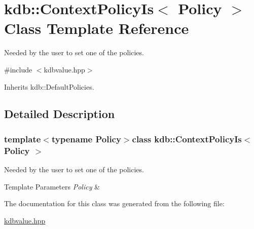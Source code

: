 \hypertarget{classkdb_1_1ContextPolicyIs}{\section{kdb\+:\+:Context\+Policy\+Is$<$ Policy $>$ Class Template Reference}
\label{classkdb_1_1ContextPolicyIs}
}


Needed by the user to set one of the policies.  




{\ttfamily \#include $<$kdbvalue.\+hpp$>$}



Inherits kdb\+::\+Default\+Policies.



\subsection{Detailed Description}
\subsubsection*{template$<$typename Policy$>$class kdb\+::\+Context\+Policy\+Is$<$ Policy $>$}

Needed by the user to set one of the policies. 


\begin{DoxyTemplParams}{Template Parameters}
{\em Policy} & \\
\hline
\end{DoxyTemplParams}


The documentation for this class was generated from the following file\+:\begin{DoxyCompactItemize}
\item 
\hyperlink{kdbvalue_8hpp}{kdbvalue.\+hpp}\end{DoxyCompactItemize}

